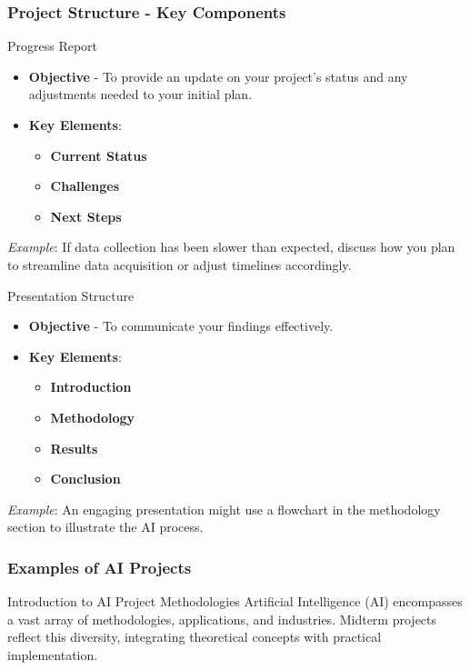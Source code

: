 \documentclass{beamer}
\begin{document}
\begin{frame}[fragile]
    \frametitle{Project Structure - Key Components}
    \begin{block}{Progress Report}
        \begin{itemize}
            \item \textbf{Objective} - To provide an update on your project's status and any adjustments needed to your initial plan.
            \item \textbf{Key Elements}:
            \begin{itemize}
                \item \textbf{Current Status}
                \item \textbf{Challenges}
                \item \textbf{Next Steps}
            \end{itemize}
        \end{itemize}
        \textit{Example}: If data collection has been slower than expected, discuss how you plan to streamline data acquisition or adjust timelines accordingly.
    \end{block}

    \begin{block}{Presentation Structure}
        \begin{itemize}
            \item \textbf{Objective} - To communicate your findings effectively.
            \item \textbf{Key Elements}:
            \begin{itemize}
                \item \textbf{Introduction}
                \item \textbf{Methodology}
                \item \textbf{Results}
                \item \textbf{Conclusion}
            \end{itemize}
        \end{itemize}
        \textit{Example}: An engaging presentation might use a flowchart in the methodology section to illustrate the AI process.
    \end{block}
\end{frame}

\begin{frame}[fragile]
    \frametitle{Examples of AI Projects}
    \begin{block}{Introduction to AI Project Methodologies}
        Artificial Intelligence (AI) encompasses a vast array of methodologies, applications, and industries. Midterm projects reflect this diversity, integrating theoretical concepts with practical implementation.
    \end{block}
\end{frame}
\end{document}
